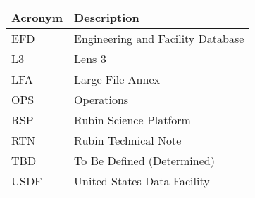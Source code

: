 \addtocounter{table}{-1}
\begin{longtable}{p{}p{}}\hline
\textbf{Acronym} & \textbf{Description}  \\\hline

EFD & Engineering and Facility Database \\\hline
L3 & Lens 3 \\\hline
LFA & Large File Annex \\\hline
OPS & Operations \\\hline
RSP & Rubin Science Platform \\\hline
RTN & Rubin Technical Note \\\hline
TBD & To Be Defined (Determined) \\\hline
USDF & United States Data Facility \\\hline
\end{longtable}
